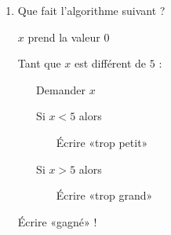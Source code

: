 \begin{MentalActivity}
\begin{mental}
\begin{enumerate}
    \begin{fmpage}{0.9\linewidth}

    Demander \( x\)

    Si \( x < 5\) alors

    ~~~ Écrire «trop petit» 

    Sinon 

    ~~~ Écrire «trop grand» 
\end{fmpage}

\item
    Que fait l'algorithme suivant ?

    \begin{fmpage}{0.9\linewidth}

        \( x\) prend la valeur 0

        Tant que \( x\) est différent de \( 5\) :

  ~ ~     Demander \( x\)

~ ~     Si \( x < 5\) alors

   ~ ~ ~~~ Écrire «trop petit» 

 ~ ~   Si \( x>5\) alors

  ~ ~  ~~~ Écrire «trop grand» 

    Écrire «gagné» !

\end{fmpage}

    \end{enumerate}
\end{mental}

\end{MentalActivity}


